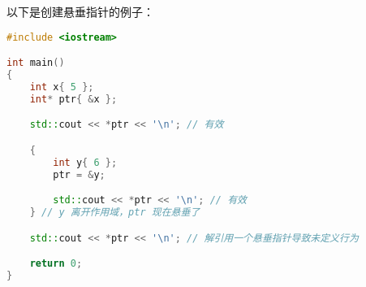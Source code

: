 \documentclass[../../LearnCpp.tex]{subfiles}
\begin{document}
以下是创建悬垂指针的例子：

\begin{lstlisting}[language=C++]
#include <iostream>

int main()
{
    int x{ 5 };
    int* ptr{ &x };

    std::cout << *ptr << '\n'; // 有效

    {
        int y{ 6 };
        ptr = &y;

        std::cout << *ptr << '\n'; // 有效
    } // y 离开作用域，ptr 现在悬垂了

    std::cout << *ptr << '\n'; // 解引用一个悬垂指针导致未定义行为

    return 0;
}
\end{lstlisting}
\end{document}
